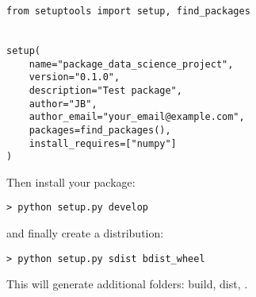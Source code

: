 \documentclass[24pt]{article}
\begin{document}
\begin{lstlisting}
from setuptools import setup, find_packages


setup(
    name="package_data_science_project",
    version="0.1.0",
    description="Test package",
    author="JB",
    author_email="your_email@example.com",
    packages=find_packages(),
    install_requires=["numpy"]
)
\end{lstlisting}

Then install your package:
\begin{lstlisting}
> python setup.py develop
\end{lstlisting}

and finally create a distribution:

\begin{lstlisting}
> python setup.py sdist bdist_wheel
\end{lstlisting}

This will generate additional folders: build, dist, .









\end{document}
